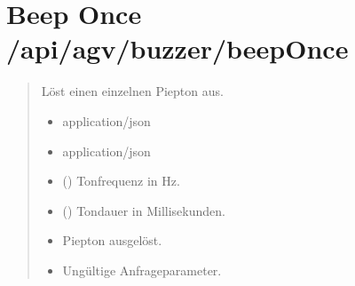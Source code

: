 \documentclass[letterpaper,10pt,english]{sphinxmanual}
\begin{document}
\section{Beep Once \sphinxhyphen{} /api/agv/buzzer/beepOnce}
\label{\detokenize{agv_rest_api_buzzer:beep-once-api-agv-buzzer-beeponce}}\label{\detokenize{agv_rest_api_buzzer:post-api-agv-buzzer-beeponce}}

\begin{fulllineitems}
\label{\detokenize{agv_rest_api_buzzer:post--api-agv-buzzer-beepOnce}}
\pysigstartsignatures
\pysigline
{}
\pysigstopsignatures\begin{quote}\begin{description}
\sphinxAtStartPar
Löst einen einzelnen Piepton aus.

\begin{itemize}
\item {} 
\sphinxAtStartPar
{} \textendash{} application/json

\end{itemize}

\begin{itemize}
\item {} 
\sphinxAtStartPar
{} \textendash{} application/json

\end{itemize}

\begin{itemize}
\item {} 
\sphinxAtStartPar
{} () \textendash{} Tonfrequenz in Hz.

\item {} 
\sphinxAtStartPar
{} () \textendash{} Tondauer in Millisekunden.

\end{itemize}

\begin{itemize}
\item {} 
\sphinxAtStartPar
{} \textendash{} Piepton ausgelöst.

\item {} 
\sphinxAtStartPar
{} \textendash{} Ungültige Anfrageparameter.

\end{itemize}

\end{description}\end{quote}

\end{fulllineitems}
\end{document}
